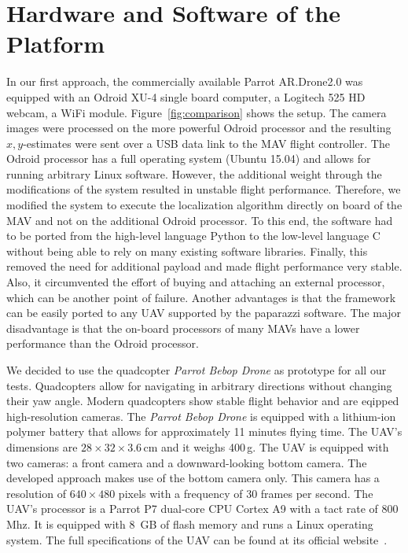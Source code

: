 \documentclass{report}
\begin{document}
\section{Hardware and Software of the Platform}
\label{sec:hardware}

In our first approach, the commercially available Parrot AR.Drone2.0
was equipped with an Odroid XU-4 single board computer, a Logitech 525
HD webcam, a WiFi module. Figure~\ref{fig:comparison} shows the
setup. The camera images were processed on the more powerful Odroid
processor and the resulting $x,y$-estimates were sent over a USB data
link to the MAV flight controller. The Odroid processor has a full
operating system (Ubuntu 15.04) and allows for running arbitrary Linux
software.  However, the additional weight through the modifications of
the system resulted in unstable flight performance. Therefore, we
modified the system to execute the localization algorithm directly on
board of the MAV and not on the additional Odroid processor. To this
end, the software had to be ported from the high-level language Python
to the low-level language C without being able to rely on many
existing software libraries.  Finally, this removed the need for
additional payload and made flight performance very stable. Also, it
circumvented the effort of buying and attaching an external processor,
which can be another point of failure. Another advantages is that the
framework can be easily ported to any UAV supported by the paparazzi
software. The major disadvantage is that the on-board processors of
many MAVs have a lower performance than the Odroid processor.

We decided to use the quadcopter \emph{Parrot Bebop Drone} as
prototype for all our tests. Quadcopters allow for navigating in
arbitrary directions without changing their yaw angle. Modern
quadcopters show stable flight behavior and are eqipped
high-resolution cameras. The \emph{Parrot Bebop Drone} is equipped
with a lithium-ion polymer battery that allows for approximately 11
minutes flying time. The UAV's dimensions are
$28 \times 32 \times 3.6$\,cm and it weighs 400\,g. The UAV is
equipped with two cameras: a front camera and a downward-looking
bottom camera. The developed approach makes use of the bottom camera
only. This camera has a resolution of $640 \times 480$ pixels with a
frequency of 30 frames per second. The UAV's processor is a Parrot P7
dual-core CPU Cortex A9 with a tact rate of 800\,Mhz. It is equipped
with 8~GB of flash memory and runs a Linux operating system. The full
specifications of the UAV can be found at its official
website~\cite{bebop}.
\end{document}
